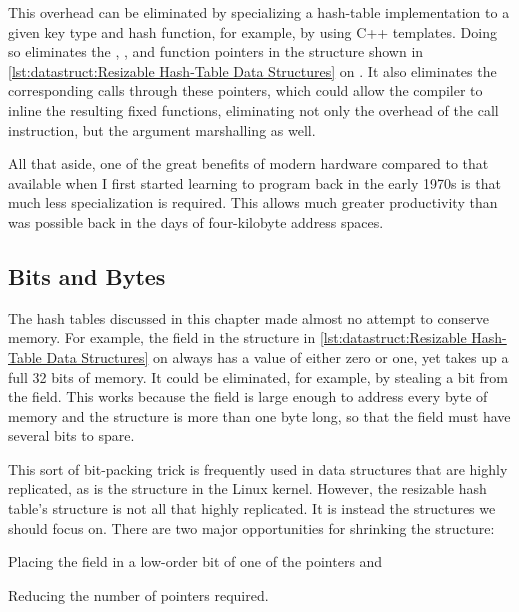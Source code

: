 This overhead can be eliminated by specializing a hash-table implementation
to a given key type and hash function, for example, by using C++ templates.
Doing so eliminates the , , and
 function pointers in the  structure shown in
\cref{lst:datastruct:Resizable Hash-Table Data Structures} on
.
It also eliminates the corresponding calls through these pointers,
which could allow the compiler to inline the resulting fixed functions,
eliminating not only the overhead of the call instruction, but the
argument marshalling as well.

\QuickQuizEnd

All that aside, one of the great benefits of modern hardware compared
to that available when I first started learning to program back in
the early 1970s is that much less specialization is required.
This allows much greater productivity than was possible back in the
days of four-kilobyte address spaces.

\subsection{Bits and Bytes}
\label{sec:datastruct:Bits and Bytes}

The hash tables discussed in this chapter made almost no attempt to conserve
memory.
For example, the  field in the  structure in
\cref{lst:datastruct:Resizable Hash-Table Data Structures} on
always has a value of either zero or one, yet takes up a full 32 bits
of memory.
It could be eliminated, for example, by stealing a bit from the
 field.
This works because the  field is large enough to
address every byte of memory and the  structure
is more than one byte long, so that
the  field must have several bits to spare.

This sort of bit-packing trick is frequently used in data structures
that are highly replicated, as is the  structure in the Linux
kernel.
However, the resizable hash table's  structure is not all that
highly replicated.
It is instead the  structures we should focus on.
There are two major opportunities for shrinking the  structure:
\begin{enumerate*}[(1)]
\item Placing the  field in a low-order bit of one of the
 pointers and
\item Reducing the number of pointers required.
\end{enumerate*}

